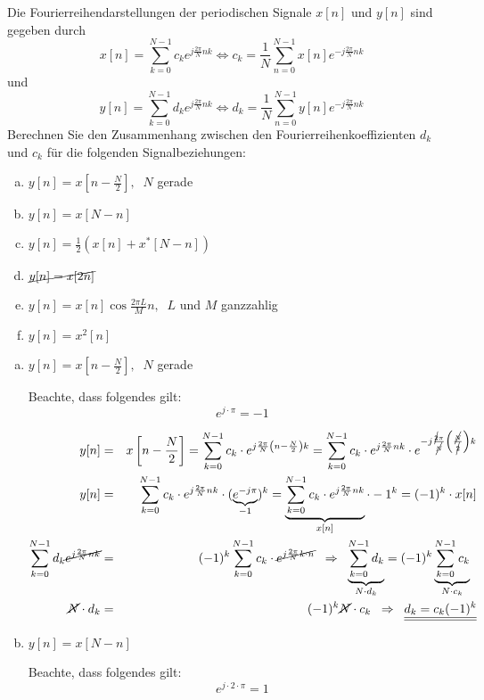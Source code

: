 \begin{uebsp}
\begin{Exercise}
    Die Fourierreihendarstellungen der periodischen Signale $x[n]$ und $y[n]$ sind gegeben durch
    \[x[n]=\sum_{k=0}^{N-1}c_ke^{j\frac{2\pi}{N}nk}\Leftrightarrow c_k=\frac{1}{N}\sum_{n=0}^{N-1}x[n]e^{-j\frac{2\pi}{N}nk}\]
    und 
    \[y[n]=\sum_{k=0}^{N-1}d_ke^{j\frac{2\pi}{N}nk}\Leftrightarrow d_k=\frac{1}{N}\sum_{n=0}^{N-1}y[n]e^{-j\frac{2\pi}{N}nk}\]
    Berechnen Sie den Zusammenhang zwischen den Fourierreihenkoeffizienten $d_k$ und $c_k$ für die folgenden Signalbeziehungen:
    \begin{enumerate}[a)]
        \item $y[n]=x\left[n-\frac{N}{2}\right],\;\;N$ gerade
        \item $y[n]=x\left[N-n\right]$
        \item $y[n]=\frac{1}{2}\left(x[n]+x^*\left[N-n\right]\right)$
        \item $\cancel{y[n]=x[2n]}$
        \item $y[n]=x[n]\cos\frac{2\pi L}{M}n,\;\;L$ und $M$ ganzzahlig
        \item $y[n]=x^2[n]$
    \end{enumerate}
\end{Exercise}
\begin{Answer}
     \begin{enumerate}[a)]
        \item $y[n]=x\left[n-\frac{N}{2}\right],\;\;N$ gerade
            \begin{uebsp_theory}
            Beachte, dass folgendes gilt:
            \[e^{j\cdot\pi}=-1\]
            \end{uebsp_theory}

        \begin{eqnarray*}
            y[n]&=&x\left[n-\frac{N}{2}\right]=\sum_{k=0}^{N-1}c_k\cdot e^{j\frac{2\pi}{N}\left(n-\frac{N}{2}\right)k}=
            \sum_{k=0}^{N-1}c_k\cdot e^{j\frac{2\pi}{N}nk}\cdot e^{-j\frac{\cancel 2\pi}{\cancel N}\left(\frac{\cancel N}{\cancel 2}\right)k}\\
        y[n]&=&\sum_{k=0}^{N-1}c_k\cdot e^{j\frac{2\pi}{N}nk}\cdot (\underbrace{e^{-j\pi}}_{-1})^k=
            \underbrace{\sum_{k=0}^{N-1}c_k\cdot e^{j\frac{2\pi}{N}nk}}_{x[n]}\cdot -1^k=(-1)^k\cdot x[n]\\
            \sum_{k=0}^{N-1}d_k\cancel{e^{j\frac{2\pi}{N}nk}}&=&(-1)^k\sum_{k=0}^{N-1}c_{k}\cdot \cancel{e^{j\frac{2\pi}{N}k\cdot n}}\;\;\Rightarrow\;\;
            \underbrace{\sum_{k=0}^{N-1}d_{k}}_{N\cdot d_{k}}=(-1)^k\underbrace{\sum_{k=0}^{N-1}c_{k}}_{N\cdot c_{k}}\;\;\\
            \cancel N\cdot d_k&=&(-1)^k\cancel N\cdot c_{k}\;\;\Rightarrow\;\;
            \underline{\underline{d_k=c_{k}(-1)^k}}
        \end{eqnarray*}
        \item $y[n]=x\left[N-n\right]$
            \begin{uebsp_theory}
            Beachte, dass folgendes gilt:
            \[e^{j\cdot 2\cdot\pi}=1\]
            \end{uebsp_theory}


\end{enumerate}
\end{Answer}
\end{uebsp}
